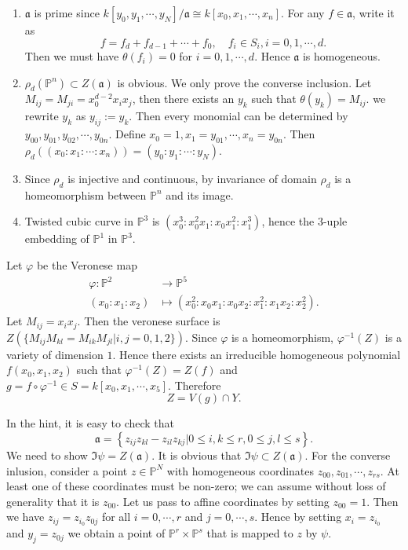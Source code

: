 \begin{solution}
  \begin{enumerate}
    \item $\mathfrak{a}$ is prime since $k[y_0,y_1,\cdots,y_{N}] / \mathfrak{a}\cong k[x_0,x_1,\cdots,x_n]$. For any $f\in \mathfrak{a}$, write it as 
      \[
      f=f_d+f_{d-1}+\cdots+f_0,\quad f_i \in S_i, i=0,1,\cdots,d.
      \] 
      Then we must have $\theta\left( f_i \right)=0 $ for $i=0,1,\cdots,d$. Hence $\mathfrak{a}$ is homogeneous.
    \item $\rho_d(\mathbb{P}^{n})\subset  Z\left( \mathfrak{a} \right) $ is obvious. We only prove the converse inclusion. Let $M_{ij}=M_{ji}=x_0^{d-2}x_i x_j$, then there exists an $y_k $ such that $\theta(y_k)=M_{ij}$. we rewrite $y_k$ as $y_{ij}:=y_k$. Then every monomial can be determined by $y_{00},y_{01},y_{02},\cdots ,y_{0n}$. Define $x_0=1,x_1=y_{01},\cdots ,x_n=y_{0n}$. Then $\rho_d\left( \left( x_0:x_1:\cdots :x_n \right)  \right) =(y_0:y_1:\cdots :y_N)$.
    \item Since $\rho_d$ is injective and continuous, by invariance of domain  $\rho_d$ is a homeomorphism between  $\mathbb{P}^{n}$ and its image.
    \item Twisted cubic curve in $\mathbb{P}^{3}$ is $\left( x_0^3:x_0^2 x_1:x_0x_1^2:x_1^3 \right) $, hence the $3$-uple embedding of $\mathbb{P}^{1}$ in $\mathbb{P}^3$.
  \end{enumerate}
\end{solution}

\begin{solution}
  Let $\varphi$ be the Veronese map
  \begin{align*}
    \varphi: \mathbb{P}^{2} &\longrightarrow \mathbb{P}^{5} \\
    (x_0:x_1:x_2) &\longmapsto \left( x_0^2:x_0x_1:x_0x_2:x_1^2:x_1x_2:x_2^2 \right) 
  .\end{align*}
  Let $M_{ij}=x_ix_j$. Then the veronese surface is  $Z\left(\{ M_{ij}M_{kl}=M_{ik}M_{jl}\lvert i,j=0,1,2\} \right) $. Since $\varphi$ is a homeomorphism, $\varphi^{-1}(Z)$ is a variety of dimension $1$. Hence there exists an irreducible homogeneous polynomial $f(x_0,x_1,x_2)$ such that $\varphi^{-1}(Z)=Z(f)$ and $g=f\circ \varphi^{-1}\in S=k[x_0,x_1,\cdots ,x_5]$. Therefore 
  \[
    Z=V(g)\cap Y.
  \] 
\end{solution}


\begin{solution}
  In the hint, it is easy to check that 
  \[
  \mathfrak{a}= \left\{ z_{ij}z_{kl}-z_{il}z_{kj}\lvert 0\le i,k \le r, 0\le j,l\le s\right\}.
  \] 
  We need to show $\Im \psi=Z(\mathfrak{a})$. It is obvious that $\Im \psi \subset Z(\mathfrak{a})$. For the converse inlusion, consider a point $z\in \mathbb{P}^{N}$ with homogeneous coordinates $z_{00},z_{01},\cdots ,z_{rs}$. At least one of these coordinates must be non-zero; we can assume without loss of generality that it is $z_{00}$. Let us pass to affine coordinates by setting $z_{00}=1$. Then we have $z_{ij}=z_{i_0}z_{0j}$ for all $i=0,\cdots ,r$ and $j=0,\cdots ,s$. Hence by setting $x_i =z_{i_0}$ and $y_{j}=z_{0j}$ we obtain a point of $\mathbb{P}^{r}\times \mathbb{P}^{s}$ that is mapped to $z$ by $\psi$.
\end{solution}


